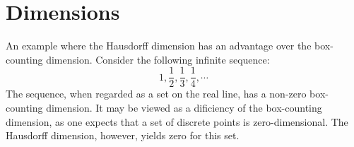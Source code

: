\documentclass[11pt]{book}
\begin{document}
\section{Dimensions}

An example where the Hausdorff dimension has an advantage over the box-counting dimension.
Consider the following infinite sequence:
\begin{equation*}
  1, \frac{1}{2}, \frac{1}{3}, \frac{1}{4}, \cdots
\end{equation*}
The sequence, when regarded as a set on the real line, has a non-zero box-counting dimension.
It may be viewed as a dificiency of the box-counting dimension, as one expects that
a set of discrete points is zero-dimensional.
The Hausdorff dimension, however, yields zero for this set.

 



\nocite{*}
\end{document}
